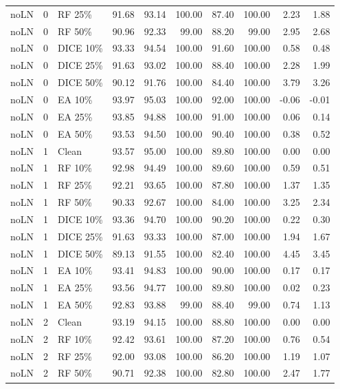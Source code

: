{\begin{longtable}{rllrrrrrrr}
noLN & 0 & RF 25\% & 91.68 & 93.14 & 100.00 & 87.40 & 100.00 & 2.23 & 1.88 \\
noLN & 0 & RF 50\% & 90.96 & 92.33 & 99.00 & 88.20 & 99.00 & 2.95 & 2.68 \\
noLN & 0 & DICE 10\% & 93.33 & 94.54 & 100.00 & 91.60 & 100.00 & 0.58 & 0.48 \\
noLN & 0 & DICE 25\% & 91.63 & 93.02 & 100.00 & 88.40 & 100.00 & 2.28 & 1.99 \\
noLN & 0 & DICE 50\% & 90.12 & 91.76 & 100.00 & 84.40 & 100.00 & 3.79 & 3.26 \\
noLN & 0 & EA 10\% & 93.97 & 95.03 & 100.00 & 92.00 & 100.00 & -0.06 & -0.01 \\
noLN & 0 & EA 25\% & 93.85 & 94.88 & 100.00 & 91.00 & 100.00 & 0.06 & 0.14 \\
noLN & 0 & EA 50\% & 93.53 & 94.50 & 100.00 & 90.40 & 100.00 & 0.38 & 0.52 \\
noLN & 1 & Clean & 93.57 & 95.00 & 100.00 & 89.80 & 100.00 & 0.00 & 0.00 \\
noLN & 1 & RF 10\% & 92.98 & 94.49 & 100.00 & 89.60 & 100.00 & 0.59 & 0.51 \\
noLN & 1 & RF 25\% & 92.21 & 93.65 & 100.00 & 87.80 & 100.00 & 1.37 & 1.35 \\
noLN & 1 & RF 50\% & 90.33 & 92.67 & 100.00 & 84.00 & 100.00 & 3.25 & 2.34 \\
noLN & 1 & DICE 10\% & 93.36 & 94.70 & 100.00 & 90.20 & 100.00 & 0.22 & 0.30 \\
noLN & 1 & DICE 25\% & 91.63 & 93.33 & 100.00 & 87.00 & 100.00 & 1.94 & 1.67 \\
noLN & 1 & DICE 50\% & 89.13 & 91.55 & 100.00 & 82.40 & 100.00 & 4.45 & 3.45 \\
noLN & 1 & EA 10\% & 93.41 & 94.83 & 100.00 & 90.00 & 100.00 & 0.17 & 0.17 \\
noLN & 1 & EA 25\% & 93.56 & 94.77 & 100.00 & 89.80 & 100.00 & 0.02 & 0.23 \\
noLN & 1 & EA 50\% & 92.83 & 93.88 & 99.00 & 88.40 & 99.00 & 0.74 & 1.13 \\
noLN & 2 & Clean & 93.19 & 94.15 & 100.00 & 88.80 & 100.00 & 0.00 & 0.00 \\
noLN & 2 & RF 10\% & 92.42 & 93.61 & 100.00 & 87.20 & 100.00 & 0.76 & 0.54 \\
noLN & 2 & RF 25\% & 92.00 & 93.08 & 100.00 & 86.20 & 100.00 & 1.19 & 1.07 \\
noLN & 2 & RF 50\% & 90.71 & 92.38 & 100.00 & 82.80 & 100.00 & 2.47 & 1.77 \\

\end{longtable}}
